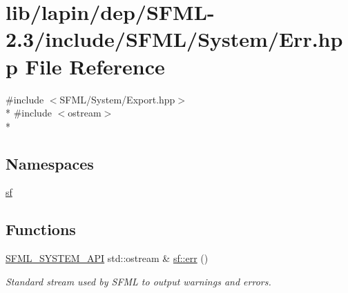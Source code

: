\hypertarget{lapin_2dep_2_s_f_m_l-2_83_2include_2_s_f_m_l_2_system_2_err_8hpp}{\section{lib/lapin/dep/\-S\-F\-M\-L-\/2.3/include/\-S\-F\-M\-L/\-System/\-Err.hpp File Reference}
\label{lapin_2dep_2_s_f_m_l-2_83_2include_2_s_f_m_l_2_system_2_err_8hpp}
}
{\ttfamily \#include $<$S\-F\-M\-L/\-System/\-Export.\-hpp$>$}\\*
{\ttfamily \#include $<$ostream$>$}\\*
\subsection*{Namespaces}
\begin{DoxyCompactItemize}
\item 
\hyperlink{namespacesf}{sf}
\end{DoxyCompactItemize}
\subsection*{Functions}
\begin{DoxyCompactItemize}
\item 
\hyperlink{sfml_2dep_2_s_f_m_l-2_84_82_2include_2_s_f_m_l_2_system_2_export_8hpp_a6476c9e422606477a4c23d92b1d79a1f}{S\-F\-M\-L\-\_\-\-S\-Y\-S\-T\-E\-M\-\_\-\-A\-P\-I} std\-::ostream \& \hyperlink{group__system_ga7fe7f475639e26334606b5142c29551f}{sf\-::err} ()
\begin{DoxyCompactList}\small\item\em Standard stream used by S\-F\-M\-L to output warnings and errors. \end{DoxyCompactList}\end{DoxyCompactItemize}
